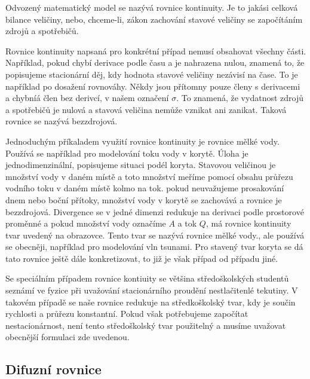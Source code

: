 \documentclass[12pt]{article}
\begin{document}
Odvozený matematický model se nazývá rovnice kontinuity. Je to jakási celková bilance veličiny, nebo, chceme-li, zákon zachování stavové veličiny se započítáním zdrojů a spotřebičů.

Rovnice kontinuity napsaná pro konkrétní případ nemusí obsahovat všechny části. Například, pokud chybí derivace podle času a je nahrazena nulou, znamená to, že popisujeme stacionární děj, kdy hodnota stavové veličiny nezávisí na čase. To je například po dosažení rovnováhy. Někdy jsou přítomny pouze členy s derivacemi a chybníá člen bez derivcí, v našem označení $\sigma$. To znamená, že vydatnost zdrojů a spotřebičů je nulová a stavová  veličina nemůže vznikat ani zanikat. Taková rovnice se nazývá bezzdrojová.

Jednoduchým příkaladem využití rovnice kontinuity je rovnice mělké vody. Používá se například pro modelování toku vody v korytě. Úloha je jednodimenzinální, popisujeme situaci podél koryta. Stavovou veličinou je množství vody v daném místě a toto množství meříme pomocí obsahu průřezu vodního toku v daném místě kolmo na tok. pokud neuvažujeme prosakování dnem nebo boční přítoky, množství vody v korytě se zachovává a rovnice je bezzdrojová. Divergence se v jedné dimenzi redukuje na derivaci podle prostorové proměnné a pokud množství vody označíme $A$ a tok $Q$, má rovnice kontinuity tvar uvedený na obrazovce. Tento tvar se nazývá rovnice mělké vody., ale používá se obecněji, například pro modelování vln tsunami. Pro stavený tvar koryta se dá tato rovnice ještě dále konkretizovat, to již je však případ od případu jiné.

Se speciálním případem rovnice kontiuity se většina středoškolských studentů seznámí ve fyzice při uvažování stacionárního proudění nestlačitenlé tekutiny. V takovém případě se naše rovnice redukuje na středkoškolský tvar, kdy je součin rychlosti a průřezu konstantní. Pokud však potřebujeme započítat nestacionárnost, není tento středoškolský tvar použitelný a musíme uvažovat obecnější formulaci zde uvedenou.

\subsection{Difuzní rovnice}
\end{document}
